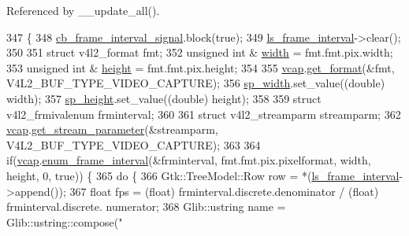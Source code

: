Referenced by \+\_\+\+\_\+update\+\_\+all().


\begin{DoxyCode}
347                                                   \{
348         \hyperlink{class_v_s_s_s___g_u_i_1_1_v4_l_interface_a4f91a6951069a2775009886057d2900d}{cb\_frame\_interval\_signal}.block(\textcolor{keyword}{true});
349         \hyperlink{class_v_s_s_s___g_u_i_1_1_v4_l_interface_a91944c46bd07555790f773506a4bcf4c}{ls\_frame\_interval}->clear();
350 
351         \textcolor{keyword}{struct }v4l2\_format fmt;
352         \textcolor{keywordtype}{unsigned} \textcolor{keywordtype}{int} & \hyperlink{namespace_c_o_n_s_t_afd10469262c8cf9aec66ca799bfea24c}{width} = fmt.fmt.pix.width;
353         \textcolor{keywordtype}{unsigned} \textcolor{keywordtype}{int} & \hyperlink{namespace_c_o_n_s_t_a9805ca9eb67b8225c60697567283175d}{height} = fmt.fmt.pix.height;
354 
355         \hyperlink{class_v_s_s_s___g_u_i_1_1_v4_l_interface_a7ece61f4ccc6d5321c445e60f34e7f33}{vcap}.\hyperlink{classv4lcap_aa5c521438e06e14625c05a02bafd35c1}{get\_format}(&fmt, V4L2\_BUF\_TYPE\_VIDEO\_CAPTURE);
356         \hyperlink{class_v_s_s_s___g_u_i_1_1_v4_l_interface_a0f492cb2c65c4021c9b9b81f4a185e84}{sp\_width}.set\_value((\textcolor{keywordtype}{double}) width);
357         \hyperlink{class_v_s_s_s___g_u_i_1_1_v4_l_interface_a7b095a3a9dc7a5895f3bac68b05b8210}{sp\_height}.set\_value((\textcolor{keywordtype}{double}) height);
358 
359         \textcolor{keyword}{struct }v4l2\_frmivalenum frminterval;
360 
361         \textcolor{keyword}{struct }v4l2\_streamparm streamparm;
362         \hyperlink{class_v_s_s_s___g_u_i_1_1_v4_l_interface_a7ece61f4ccc6d5321c445e60f34e7f33}{vcap}.\hyperlink{classv4lcap_a067a6b97d6c4d3ea83454132f1d3c87e}{get\_stream\_parameter}(&streamparm, V4L2\_BUF\_TYPE\_VIDEO\_CAPTURE);
363 
364         \textcolor{keywordflow}{if}(\hyperlink{class_v_s_s_s___g_u_i_1_1_v4_l_interface_a7ece61f4ccc6d5321c445e60f34e7f33}{vcap}.\hyperlink{classv4lcap_af4e34a5583945f2d24dd0cb298b5e191}{enum\_frame\_interval}(&frminterval, fmt.fmt.pix.pixelformat, width, 
      height, 0, \textcolor{keyword}{true})) \{
365             \textcolor{keywordflow}{do} \{
366                 Gtk::TreeModel::Row row = *(\hyperlink{class_v_s_s_s___g_u_i_1_1_v4_l_interface_a91944c46bd07555790f773506a4bcf4c}{ls\_frame\_interval}->append());
367                 \textcolor{keywordtype}{float} fps = (float) frminterval.discrete.denominator / (\textcolor{keywordtype}{float}) frminterval.discrete.
      numerator;
368                 Glib::ustring name = Glib::ustring::compose(\textcolor{stringliteral}{"%
}
\end{DoxyCode}
